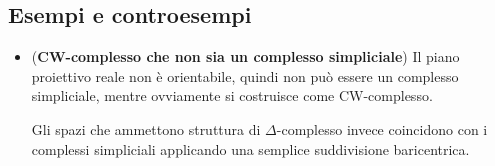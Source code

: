 \documentclass[a4paper,NoNotes,GeneralMath]{stdmdoc}
\begin{document}
\subsection*{Esempi e controesempi}
\begin{itemize}
\item ({\bf CW-complesso che non sia un complesso simpliciale}) Il piano proiettivo reale non è orientabile, quindi non può essere un complesso simpliciale, mentre ovviamente si costruisce come CW-complesso.

  Gli spazi che ammettono struttura di $\Delta$-complesso invece coincidono con i complessi simpliciali applicando una semplice suddivisione baricentrica.
\end{itemize}
\end{document}

